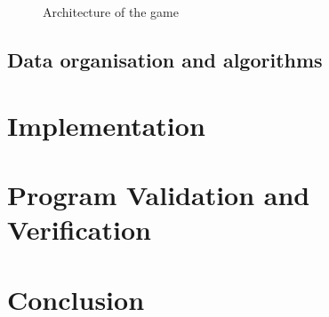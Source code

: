 \documentclass[11pt,a4paper]{article}
\begin{document}
\begin{figure}[H]
    \caption{Architecture of the game}
    \label{fig:architecture}
\end{figure}
\subsection{Data organisation and algorithms}


\section{Implementation}

\section{Program Validation and Verification}


\section{Conclusion}
\end{document}
